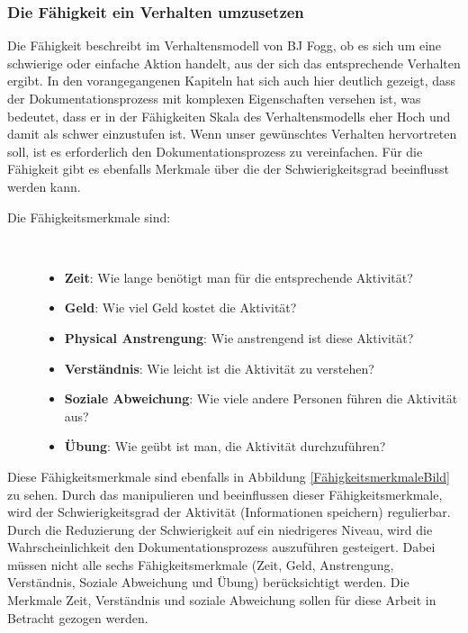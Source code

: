 \documentclass[a4paper,12pt,twoside]{scrartcl}
\begin{document}
\subsubsection{Die Fähigkeit ein Verhalten umzusetzen}
Die Fähigkeit beschreibt im Verhaltensmodell von BJ Fogg, ob es sich um eine schwierige oder einfache Aktion handelt, aus der sich das entsprechende Verhalten ergibt. In den vorangegangenen Kapiteln hat sich auch hier deutlich gezeigt, dass der Dokumentationsprozess mit komplexen Eigenschaften versehen ist, was bedeutet, dass er in der Fähigkeiten Skala des Verhaltensmodells eher Hoch und damit als schwer einzustufen ist. Wenn unser gewünschtes Verhalten hervortreten soll, ist es erforderlich den Dokumentationsprozess zu vereinfachen. Für die Fähigkeit gibt es ebenfalls Merkmale über die der Schwierigkeitsgrad beeinflusst werden kann.
\begin{description}
   \item[Die Fähigkeitsmerkmale sind:]~\par
   \begin{itemize}
      \item \textbf{Zeit}: Wie lange benötigt man für die entsprechende Aktivität?
      \item \textbf{Geld}: Wie viel Geld kostet die Aktivität?
      \item \textbf{Physical Anstrengung}: Wie anstrengend ist diese Aktivität?
      \item \textbf{Verständnis}: Wie leicht ist die Aktivität zu verstehen?
      \item \textbf{Soziale Abweichung}: Wie viele andere Personen führen die Aktivität aus?
      \item \textbf{Übung}: Wie geübt ist man, die Aktivität durchzuführen?
   \end{itemize}
\end{description}
Diese Fähigkeitsmerkmale sind ebenfalls in Abbildung \ref{FähigkeitsmerkmaleBild} zu sehen. Durch das manipulieren und beeinflussen dieser Fähigkeitsmerkmale, wird der Schwierigkeitsgrad der Aktivität (Informationen speichern) regulierbar. Durch die Reduzierung der Schwierigkeit auf ein niedrigeres Niveau, wird die Wahrscheinlichkeit den Dokumentationsprozess auszuführen gesteigert. Dabei müssen nicht alle sechs Fähigkeitsmerkmale (Zeit, Geld, Anstrengung, Verständnis, Soziale Abweichung und Übung) berücksichtigt werden. Die Merkmale Zeit, Verständnis und soziale Abweichung sollen für diese Arbeit in Betracht gezogen werden. 
\\
\end{document}
